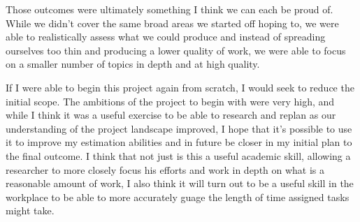 Those outcomes were ultimately something I think we can each be proud of. While
we didn't cover the same broad areas we started off hoping to, we were able to
realistically assess what we could produce and instead of spreading ourselves
too thin and producing a lower quality of work, we were able to focus on a
smaller number of topics in depth and at high quality.

If I were able to begin this project again from scratch, I would seek to reduce
the initial scope. The ambitions of the project to begin with were very high,
and while I think it was a useful exercise to be able to research and replan as
our understanding of the project landscape improved, I hope that it's possible
to use it to improve my estimation abilities and in future be closer in my
initial plan to the final outcome. I think that not just is this a useful
academic skill, allowing a researcher to more closely focus his efforts and
work in depth on what is a reasonable amount of work, I also think it will turn
out to be a useful skill in the workplace to be able to more accurately guage
the length of time assigned tasks might take.
